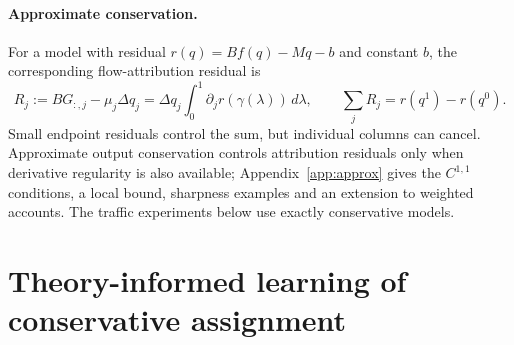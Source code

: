 \documentclass[a4paper,fleqn]{cas-sc}
\begin{document}
\paragraph{Approximate conservation.}
For a model with residual $r(q)=Bf(q)-Mq-b$ and constant $b$, the
corresponding flow-attribution residual is
\begin{equation}
R_j:=BG_{:,j}-\mu_j\Delta q_j
=\Delta q_j\int_0^1\partial_jr(\gamma(\lambda))\,d\lambda,
\qquad \sum_jR_j=r(q^1)-r(q^0).
\label{eq:residualidentity}
\end{equation}
Small endpoint residuals control the sum, but individual columns can cancel.
Approximate output conservation controls attribution residuals only when
derivative regularity is also available; Appendix~\ref{app:approx} gives
the $C^{1,1}$ conditions, a local bound, sharpness examples and an
extension to weighted accounts. The traffic experiments below use exactly
conservative models.




\FloatBarrier
\section{Theory-informed learning of conservative assignment}\label{sec:pairresults}
\end{document}
